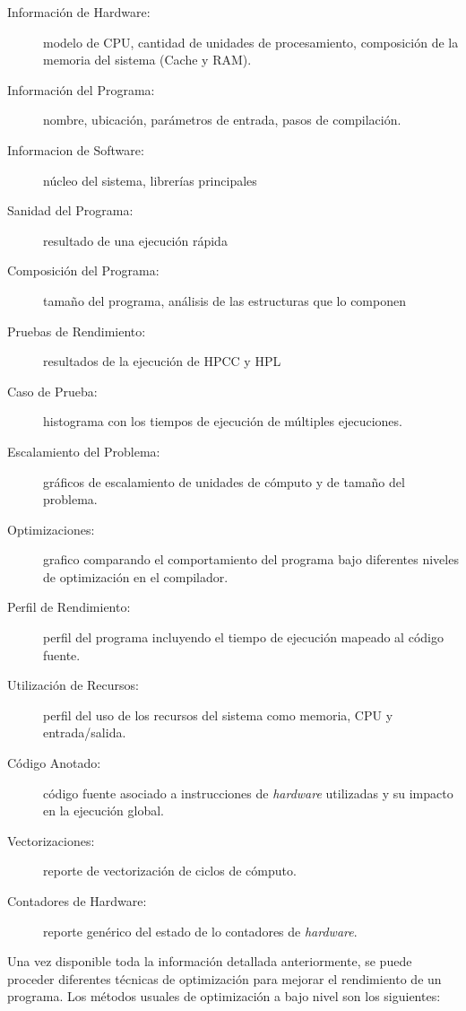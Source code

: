 \documentclass[a4paper]{article}
\begin{document}
\begin{description}
\item[Información de Hardware:] modelo de CPU, cantidad de unidades de procesamiento, composición de la memoria del sistema (Cache y RAM).
\item[Información del Programa:] nombre, ubicación, parámetros de entrada, pasos de compilación.
\item[Informacion de Software:] núcleo del sistema, librerías principales
\item[Sanidad del Programa:] resultado de una ejecución rápida
\item[Composición del Programa:] tamaño del programa, análisis de las estructuras que lo componen
\item[Pruebas de Rendimiento:] resultados de la ejecución de HPCC y HPL
\item[Caso de Prueba:] histograma con los tiempos de ejecución de múltiples ejecuciones.
\item[Escalamiento del Problema:] gráficos de escalamiento de unidades de cómputo y de tamaño del problema.
\item[Optimizaciones:] grafico comparando el comportamiento del programa bajo diferentes niveles de optimización en el compilador.
\item[Perfil de Rendimiento:] perfil del programa incluyendo el tiempo de ejecución mapeado al código fuente.
\item[Utilización de Recursos:] perfil del uso de los recursos del sistema como memoria, CPU y entrada/salida.
\item[Código Anotado:] código fuente asociado a instrucciones de {\it hardware} utilizadas y su impacto en la ejecución global.
\item[Vectorizaciones:] reporte de vectorización de ciclos de cómputo.
\item[Contadores de Hardware:] reporte genérico del estado de lo contadores de {\it hardware}.
\end{description}

Una vez disponible toda la información detallada anteriormente, se puede proceder diferentes técnicas de optimización para mejorar el rendimiento de un programa. Los métodos usuales de optimización a bajo nivel son los siguientes:
\end{document}
